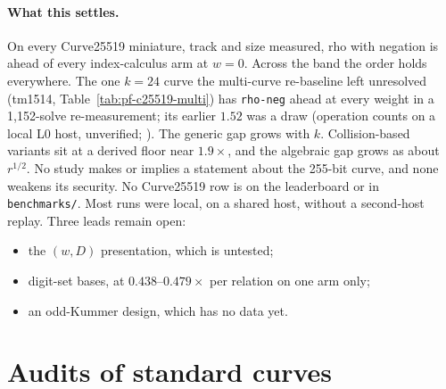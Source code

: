 \paragraph{What this settles.} On every Curve25519 miniature, track and
size measured, rho with negation is ahead of every index-calculus arm at
$w=0$. Across the band the order holds everywhere. The one $k=24$ curve
the multi-curve re-baseline left unresolved (tm1514,
Table~\ref{tab:pf-c25519-multi}) has \texttt{rho-neg} ahead at every
weight in a 1{,}152-solve re-measurement; its earlier $1.52$ was a draw
(operation counts on a local L0 host, unverified;
). The generic gap grows with $k$. Collision-based variants sit at a
derived floor near $1.9\times$, and the algebraic gap grows as about
$r^{1/2}$. No study makes or implies a statement about the 255-bit curve,
and none weakens its security. No Curve25519 row is on the leaderboard or
in \texttt{benchmarks/}. Most runs were local, on a shared host, without a
second-host replay. Three leads remain open:
\begin{itemize}
\item the $(w,D)$ presentation, which is untested;
\item digit-set bases, at $0.438$--$0.479\times$ per relation on one arm
  only;
\item an odd-Kummer design, which has no data yet.
\end{itemize}

\section{Audits of standard curves}

